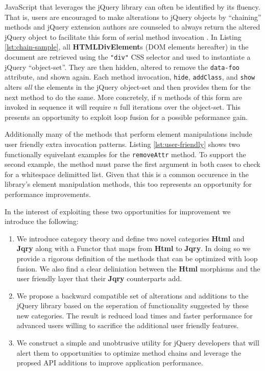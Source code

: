 \documentclass[preprint, leqno]{sigplanconf}
\begin{document}
JavaScript that leverages the jQuery library can often be identified by its fluency. That is, users are encouraged to make alterations to jQuery objects by ``chaining'' methods and jQuery extension authors are counseled to always return the altered jQuery object to facilitate this form of serial method invocation \cite{bib:chaining}. In Listing \ref{lst:chain-sample}, all \textbf{HTMLDivElement}s (DOM elements hereafter) in the document are retrieved using the \verb|"div"| CSS selector and used to instantiate a jQuery ``object-set''. They are then hidden, altered to remove the \verb|data-foo| attribute, and shown again. Each method invocation, \verb|hide|, \verb|addClass|, and \verb|show| alters \textit{all} the elements in the jQuery object-set and then provides them for the next method to do the same. More concretely, if \begin{math}n\end{math} methods of this form are invoked in sequence it will require \begin{math}n\end{math} full iterations over the object-set. This presents an opportunity to exploit loop fusion for a possible peformance gain.

Additionally many of the methods that perform element manipulations include user friendly extra invocation patterns. Listing \ref{lst:user-friendly} shows two functionally equivelant examples for the \verb|removeAttr| method. To support the second example, the method must parse the first argument in both cases to check for a whitespace delimitted list. Given that this is a common occurence in the library's element manipulation methods, this too represents an opportunity for performance improvements.

In the interest of exploiting these two opportunities for improvement we introduce the following:

\begin{enumerate}
\item We introduce category theory and define two novel categories \textbf{Html} and \textbf{Jqry} along with a Functor that maps from \textbf{Html} to \textbf{Jqry}. In doing so we provide a rigorous definition of the methods that can be optimized with loop fusion. We also find a clear deliniation between the \textbf{Html} morphisms and the user friendly layer that their \textbf{Jqry} counterparts add.
\item We propose a backward compatible set of alterations and additions to the jQuery library based on the seperation of functionality suggested by these new categories. The result is reduced load times and faster performance for advanced users willing to sacrifice the additional user friendly features.
\item We construct a simple and unobtrusive utility for jQuery developers that will alert them to opportunities to optimize method chains and leverage the propsed API additions to improve application performance.
\end{enumerate}
\end{document}
